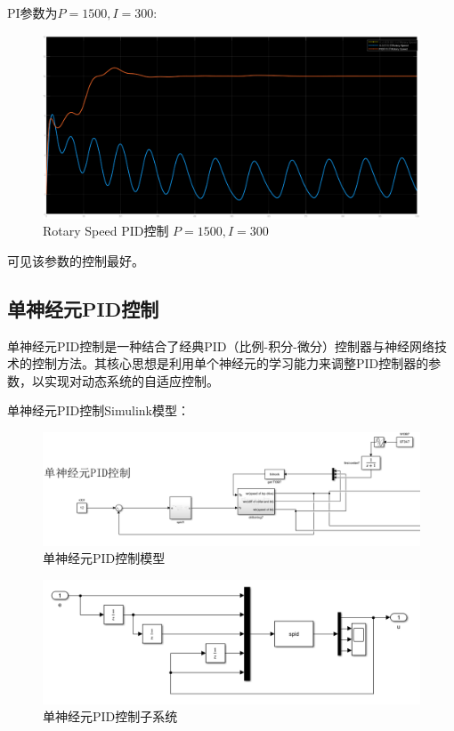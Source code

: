\documentclass[12pt,hyperref,a4paper,UTF8]{ctexart}
\begin{document}
	
	
	PI参数为$P=1500,I=300$:
	
	
	
	\begin{figure}[!htbp]
		\centering
		\includegraphics[width=0.7\linewidth]{figures/Rotary_Speed_PID控制_P1500_I300}
		\caption{Rotary Speed PID控制 $P=1500,I=300$}
		\label{fig:Rotary_Speed_PID控制_P1500_I300}
	\end{figure}
	
	可见该参数的控制最好。
	
	\subsection{单神经元PID控制}
	单神经元PID控制是一种结合了经典PID（比例-积分-微分）控制器与神经网络技术的控制方法。其核心思想是利用单个神经元的学习能力来调整PID控制器的参数，以实现对动态系统的自适应控制。
	
	单神经元PID控制Simulink模型：
	\begin{figure}[!htbp]
		\centering
		\includegraphics[width=0.7\linewidth]{figures/单神经元PID控制模型.png}
		\caption{单神经元PID控制模型}
		\label{fig:单神经元PID控制模型}
	\end{figure}
	
	\begin{figure}[!htbp]
		\centering
		\includegraphics[width=0.7\linewidth]{figures/单神经元PID控制子系统.png}
		\caption{单神经元PID控制子系统}
		\label{fig:单神经元PID控制子系统}
	\end{figure}
	
\end{document}
